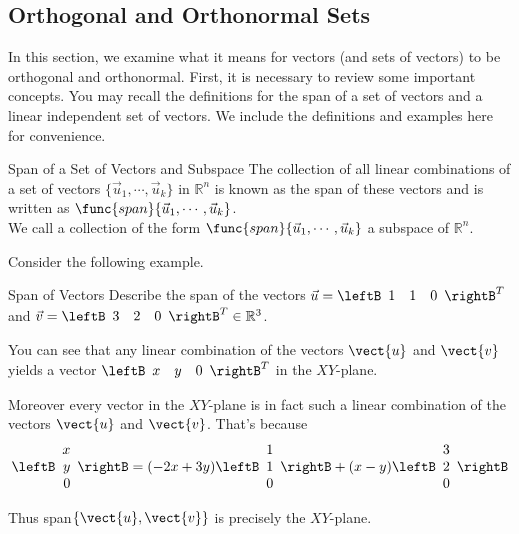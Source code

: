 \subsection{Orthogonal and Orthonormal Sets}

In this section, we examine what it means for vectors (and sets of
vectors) to be orthogonal and orthonormal. First, it is necessary to
review some important concepts. You may recall the definitions for the
span of a set of vectors and a linear independent set of vectors. We
include the definitions and examples here for convenience.

\begin{definition}{Span of a Set of Vectors and Subspace}\label{def:span}
The collection of all linear combinations of a set of vectors $\{ \vec{u}_1,
\cdots ,\vec{u}_k\}$ in $\mathbb{R}^{n}$ is known as the span of these
vectors and is written as $\func{span} \{\vec{u}_1, \cdots ,
\vec{u}_k\}$. \\ 
We call a collection of the form $\func{span} \{\vec{u}_1, \cdots , \vec{u}_k\}$ 
a subspace of $\mathbb{R}^{n}$.
 
\end{definition}

Consider the following example. 

\begin{example}{Span of Vectors}\label{exa:spanvectors}
Describe the span of the vectors $\vec{u}=\leftB 
\begin{array}{rrr}
1  & 1 & 0
\end{array}
\rightB^T$ and
$\vec{v}=\leftB 
\begin{array}{rrr}
3  & 2 & 0
\end{array}
\rightB^T \in \mathbb{R}^{3}$.
\end{example}

\begin{solution}
You can see that any linear combination of the vectors $\vect{u}$ and $\vect{v}$ yields a vector 
$\leftB 
\begin{array}{rrr}
x  & y & 0
\end{array}
\rightB^T$ in the $XY$-plane. 

Moreover every vector in the $XY$-plane is in fact such a linear
combination of the vectors $\vect{u}$ and $\vect{v}$. That's because
\[ \leftB 
\begin{array}{r}
x \\
y \\
0
\end{array}
\rightB 
=
(-2x+3y) \leftB 
\begin{array}{r}
1 \\
1 \\
0
\end{array}
\rightB
+
(x-y)\leftB 
\begin{array}{r}
3 \\
2 \\
0
\end{array}
\rightB 
\]

Thus  span$\{\vect{u},\vect{v}\}$ is precisely the $XY$-plane.
\end{solution}

